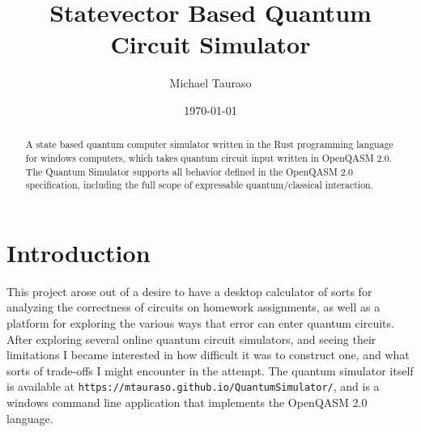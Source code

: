 \documentclass[%
 reprint,
 amsmath,amssymb,
 aps,
]{revtex4-2}
\begin{document}

\title{Statevector Based Quantum Circuit Simulator}
\author{Michael Tauraso}
%


%

\date{\today}%

\begin{abstract}
A state based quantum computer simulator written in the Rust programming language for windows computers, which takes quantum circuit input written in OpenQASM 2.0. The Quantum Simulator supports all behavior defined in the OpenQASM 2.0 specification, including the full scope of expressable quantum/classical interaction.\end{abstract}

\maketitle




\section{\label{sec:level1}Introduction}
This project arose out of a desire to have a desktop calculator of sorts for analyzing the correctness of circuits on homework assignments, as well as a platform for exploring the various ways that error can enter quantum circuits. After exploring several online quantum circuit simulators, and seeing their limitations I became interested in how difficult it was to construct one, and what sorts of trade-offs I might encounter in the attempt. The quantum simulator itself is available at \texttt{https://mtauraso.github.io/QuantumSimulator/}, and is a windows command line application that implements the OpenQASM 2.0 language.
\end{document}
